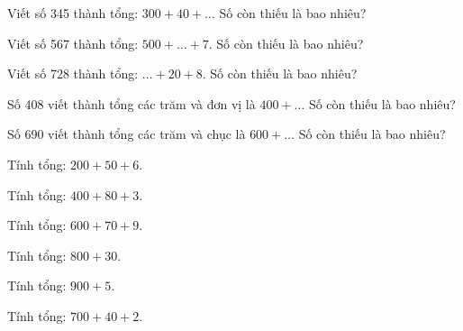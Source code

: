 \begin{ex}
Viết số 345 thành tổng: $300 + 40 + \dots$ Số còn thiếu là bao nhiêu?
\end{ex}

\begin{ex}
Viết số 567 thành tổng: $500 + \dots + 7$. Số còn thiếu là bao nhiêu?
\end{ex}

\begin{ex}
Viết số 728 thành tổng: $\dots + 20 + 8$. Số còn thiếu là bao nhiêu?
\end{ex}

\begin{ex}
Số 408 viết thành tổng các trăm và đơn vị là $400 + \dots$ Số còn thiếu là bao nhiêu?
\end{ex}

\begin{ex}
Số 690 viết thành tổng các trăm và chục là $600 + \dots$ Số còn thiếu là bao nhiêu?
\end{ex}

\begin{ex}
Tính tổng: $200 + 50 + 6$.
\end{ex}

\begin{ex}
Tính tổng: $400 + 80 + 3$.
\end{ex}

\begin{ex}
Tính tổng: $600 + 70 + 9$.
\end{ex}

\begin{ex}
Tính tổng: $800 + 30$.
\end{ex}

\begin{ex}
Tính tổng: $900 + 5$.
\end{ex}

\begin{ex}
Tính tổng: $700 + 40 + 2$.
\end{ex}

